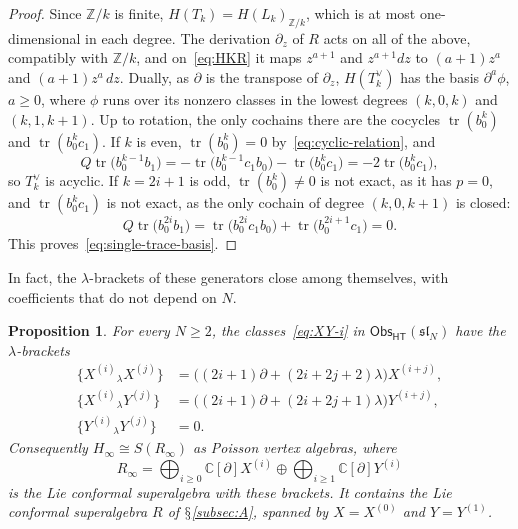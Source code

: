 \documentclass[11pt]{amsart}
\numberwithin{equation}{section}
\renewcommand{\S}{\mbox{$\mathsection$}}
\newtheorem{proposition}[theorem]{Proposition}
\theoremstyle{definition}
\theoremstyle{remark}
\newcommand{\C}{\mathbb{C}}
\newcommand{\dd}{\partial}
\newcommand{\Obs}{\mathsf{Obs}_{\mathsf{HT}}}
\begin{document}
\begin{proof}
Since $\mathbb Z/k$ is finite, $H(T_k)=H(L_k)_{\mathbb Z/k}$, which is at most one-dimensional in each degree. The derivation $\dd_z$ of $R$ acts on all of the above, compatibly with $\mathbb Z/k$, and on~\eqref{eq:HKR} it maps $z^{a+1}$ and $z^{a+1}dz$ to $(a+1)z^a$ and $(a+1)z^a\,dz$. Dually, as $\dd$ is the transpose of $\dd_z$, $H(T^\vee_k)$ has the basis $\dd^a\phi$, $a\ge0$, where $\phi$ runs over its nonzero classes in the lowest degrees $(k,0,k)$ and $(k,1,k+1)$. Up to rotation, the only cochains there are the cocycles $\operatorname{tr}(b_0^k)$ and $\operatorname{tr}(b_0^kc_1)$. If $k$ is even, $\operatorname{tr}(b_0^k)=0$ by~\eqref{eq:cyclic-relation}, and
\begin{equation}\label{eq:trace-exact-even}
Q\operatorname{tr}\bigl(b_0^{k-1}b_1\bigr)=-\operatorname{tr}\bigl(b_0^{k-1}c_1b_0\bigr)-\operatorname{tr}\bigl(b_0^kc_1\bigr)=-2\operatorname{tr}\bigl(b_0^kc_1\bigr),
\end{equation}
so $T^\vee_k$ is acyclic. If $k=2i+1$ is odd, $\operatorname{tr}(b_0^k)\ne0$ is not exact, as it has $p=0$, and $\operatorname{tr}(b_0^kc_1)$ is not exact, as the only cochain of degree $(k,0,k+1)$ is closed:
\begin{equation}\label{eq:trace-closed}
Q\operatorname{tr}\bigl(b_0^{2i}b_1\bigr)=\operatorname{tr}\bigl(b_0^{2i}c_1b_0\bigr)+\operatorname{tr}\bigl(b_0^{2i+1}c_1\bigr)=0 .
\end{equation}
This proves~\eqref{eq:single-trace-basis}.
\end{proof}

In fact, the $\lambda$-brackets of these generators close among themselves, with coefficients that do not depend on $N$.

\begin{proposition}\label{prop:stable-brackets}
For every $N\ge2$, the classes~\eqref{eq:XY-i} in $\Obs(\mathfrak{sl}_N)$ have the $\lambda$-brackets
\begin{align}
\{X^{(i)}{}_\lambda X^{(j)}\}&=\bigl((2i+1)\dd+(2i+2j+2)\lambda\bigr)X^{(i+j)},\label{eq:XX-stable}\\
\{X^{(i)}{}_\lambda Y^{(j)}\}&=\bigl((2i+1)\dd+(2i+2j+1)\lambda\bigr)Y^{(i+j)},\label{eq:XY-stable}\\
\{Y^{(i)}{}_\lambda Y^{(j)}\}&=0.\label{eq:YY-stable}
\end{align}
Consequently $H_\infty\cong S(R_\infty)$ as Poisson vertex algebras, where
\begin{equation}\label{eq:R-infinity}
R_\infty=\bigoplus_{i\ge0}\C[\dd]X^{(i)}\oplus\bigoplus_{i\ge1}\C[\dd]Y^{(i)}
\end{equation}
is the Lie conformal superalgebra with these brackets. It contains the Lie conformal superalgebra $R$ of \S\ref{subsec:A}, spanned by $X=X^{(0)}$ and $Y=Y^{(1)}$.
\end{proposition}
\end{document}
